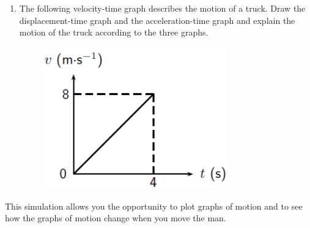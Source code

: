 \begin{enumerate}[noitemsep, label=\textbf{\arabic*}. ]
\begin{figure}[H]
\begin{center}
      \vspace{2pt}
    \vspace{.1in}
    
    \end{center}

 \end{figure}   

    \addtocounter{footnote}{-0}
            \label{m38795*uid120}\item The following velocity-time graph describes the motion of a truck. Draw the displacement-time graph and the acceleration-time graph and explain the motion of the truck according to the three graphs.

    \setcounter{subfigure}{0}


	\begin{figure}[H] %
    \begin{center}
    \label{m38795*id73089!!!underscore!!!media}\label{m38795*id73089!!!underscore!!!printimage}\includegraphics[width=300px]{col11305.imgs/m38795_PG10C2_028.png} %
        
      \vspace{2pt}
    \vspace{.1in}
    
    \end{center}

 \end{figure}   

    \addtocounter{footnote}{-0}
            \end{enumerate}
        
          
\label{m38795*eip-842}This simulation allows you the opportunity to plot graphs of motion and to see how the graphs of motion change when you move the man.

    \setcounter{subfigure}{0}


